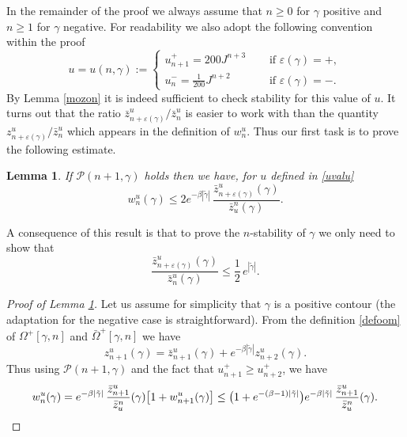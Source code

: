 \documentclass[10pt]{amsart}
\let\mathcal\mathscr
\numberwithin{equation}{section}
\theoremstyle{plain}
\newtheorem{lemma}[theorem]{Lemma}
\theoremstyle{definition}
\newcommand{\cP}{{\ensuremath{\mathcal P}} }
\newcommand{\gb}{\beta}
\newcommand{\gep}{\varepsilon}
\newcommand{\gO}{\Omega}
\begin{document}
In the remainder of the proof we always assume that $n\ge 0$ for $\gamma$ positive and $n\ge 1$ for $\gamma$ negative.
For readability we also adopt the following convention within the proof%
\begin{equation}\label{uvalu}
u=u(n,\gamma):=\begin{cases}
u^+_{n+1}=200 J^{n+3} \quad & \text{ if } \gep(\gamma)=+,\\
u^-_{n}=\frac{1}{200} J^{n+2} \quad & \text{ if } \gep(\gamma)=-.
\end{cases}
\end{equation}
By Lemma \ref{mozon} it is indeed sufficient to check stability for this value of $u$.
It turns out that the ratio $\bar z^{u}_{n+\gep(\gamma)}/\bar z^{u}_n$ is easier to work with than the quantity $z^{u}_{n+\gep(\gamma)}/\bar z^{u}_n$ which appears in the definition of $w^u_n$.
Thus our first task is to prove the following estimate.

\begin{lemma}\label{reduc}
If $\cP(n+1,\gamma)$ holds then we have, for $u$ defined in \eqref{uvalu}
\begin{equation*}
w^u_n(\gamma)\le 2e^{-\gb |\tilde \gamma|}\,\frac{\bar z^{u}_{n+\gep(\gamma)}(\gamma)}{\bar z^n_u(\gamma)}.
\end{equation*}
\end{lemma}
A consequence of this result is that to prove the $n$-stability of $\gamma$ we only need to show that
\begin{equation}\label{core}
\frac{\bar z^{u}_{n+\gep(\gamma)}(\gamma)}{\bar z^{u}_n(\gamma)}\le \frac{1}{2}\,e^{|\tilde \gamma|}.
\end{equation}

\begin{proof}[Proof of Lemma \ref{reduc}]
Let us assume for simplicity that $\gamma$ is a positive contour (the adaptation for the negative case is straightforward).
From the definition \eqref{defoom} of $\gO^+[\gamma,n]$ and $\bar \gO^+[\gamma,n]$ we have
\[
z^u_{n+1}(\gamma)=\bar z^u_{n+1}(\gamma)+e^{-\gb |\tilde \gamma|} z^u_{n+2}(\gamma).
\]
Thus using $\cP(n+1,\gamma)$ and the fact that $u_{n+1}^+\ge u^+_{n+2}$, we have
\begin{equation*}
w^u_n(\gamma)=e^{-\gb |\tilde \gamma|}\, \frac{\bar z^{u}_{n+1}}{\bar z^n_u}(\gamma) \bigl[ 1+ w^u_{n+1}(\gamma)\bigr]
\le \bigl(1+e^{-(\gb-1)|\tilde \gamma|}\bigr)e^{-\gb |\tilde \gamma|}\,\frac{\bar z^{u}_{n+1}}{\bar z^n_u}(\gamma).\qedhere
\end{equation*}
\end{proof}
\end{document}

